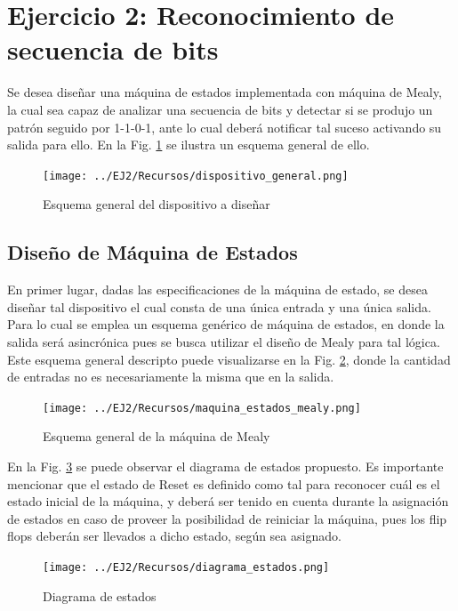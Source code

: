 \section{Ejercicio 2: Reconocimiento de secuencia de bits}
Se desea dise\~nar una m\'aquina de estados implementada con m\'aquina de Mealy, la cual sea capaz de analizar una secuencia de bits y detectar si se produjo un patr\'on
seguido por 1-1-0-1, ante lo cual deber\'a notificar tal suceso activando su salida para ello. En la Fig. \ref{fig:esquema_general_dispositivo} se ilustra un esquema general de ello.

\begin{figure}[H]
    \centering
    \texttt{[image: ../EJ2/Recursos/dispositivo\_general.png]}
    \caption{Esquema general del dispositivo a dise\~nar}
    \label{fig:esquema_general_dispositivo}
\end{figure}

\subsection{Dise\~no de M\'aquina de Estados}
En primer lugar, dadas las especificaciones de la m\'aquina de estado, se desea dise\~nar tal dispositivo el cual consta de una \'unica entrada y una \'unica salida. Para lo cual se
emplea un esquema gen\'erico de m\'aquina de estados, en donde la salida ser\'a asincr\'onica pues se busca utilizar el dise\~no de Mealy para tal l\'ogica. Este esquema general descripto
puede visualizarse en la Fig. \ref{fig:esquema_general_mealy}, donde la cantidad de entradas no es necesariamente la misma que en la salida.

\begin{figure}[H]
    \centering
    \texttt{[image: ../EJ2/Recursos/maquina\_estados\_mealy.png]}
    \caption{Esquema general de la m\'aquina de Mealy}
    \label{fig:esquema_general_mealy}
\end{figure}

En la Fig. \ref{fig:diagrama_estados_ejercicio_2} se puede observar el diagrama de estados propuesto. Es importante mencionar que el estado de Reset es definido como tal
para reconocer cu\'al es el estado inicial de la m\'aquina, y deber\'a ser tenido en cuenta durante la asignaci\'on de estados en caso de proveer la posibilidad de reiniciar la m\'aquina,
pues los flip flops deber\'an ser llevados a dicho estado, seg\'un sea asignado.

\begin{figure}[H]
    \centering
    \texttt{[image: ../EJ2/Recursos/diagrama\_estados.png]}
    \caption{Diagrama de estados}
    \label{fig:diagrama_estados_ejercicio_2}
\end{figure}

